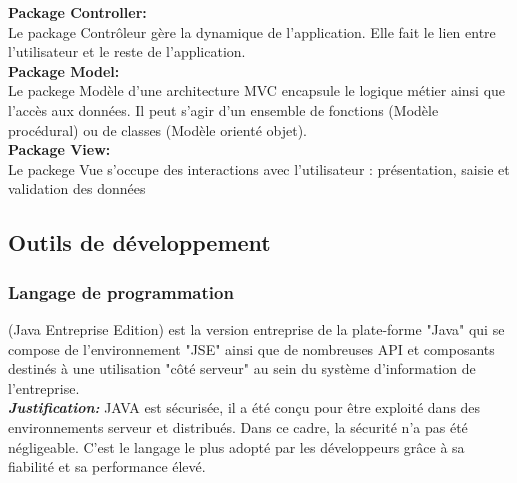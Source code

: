 \documentclass[a4paper]{report}
\begin{document}
\begin{spacing}{2}
\textbf{Package Controller:}\\
Le package Contrôleur gère la dynamique de l'application. Elle fait le lien entre l'utilisateur et le reste de l'application.\\

\textbf{Package Model:}\\
Le packege Modèle d'une architecture MVC encapsule le logique métier  ainsi que l'accès aux données. Il peut s'agir d'un ensemble de fonctions (Modèle procédural) ou de classes (Modèle orienté objet).\\

\textbf{Package View:}\\
Le packege Vue s'occupe des interactions avec l'utilisateur : présentation, saisie et validation des données\\



\subsection{Outils de développement }
\subsubsection{Langage de programmation}
\begin{minipage}{0.18\textwidth}
	\begin{minipage}{\linewidth}
\end{minipage}
\end{minipage}
\hfill
\begin{minipage}{0.75\textwidth}
(Java Entreprise Edition) est la version entreprise de la plate-forme "Java" qui se compose de l'environnement "JSE" ainsi que de nombreuses API et composants destinés à une utilisation "côté serveur" au sein du système d'information de l'entreprise.\\
\textbf{\textit{Justification:}} JAVA est sécurisée, il a été conçu pour être exploité dans des environnements serveur et distribués. Dans ce cadre, la sécurité n’a pas été négligeable. C’est le langage le plus adopté par les développeurs grâce à sa fiabilité et sa performance élevé. \\
\end{minipage}\\


\end{spacing}
\end{document}
